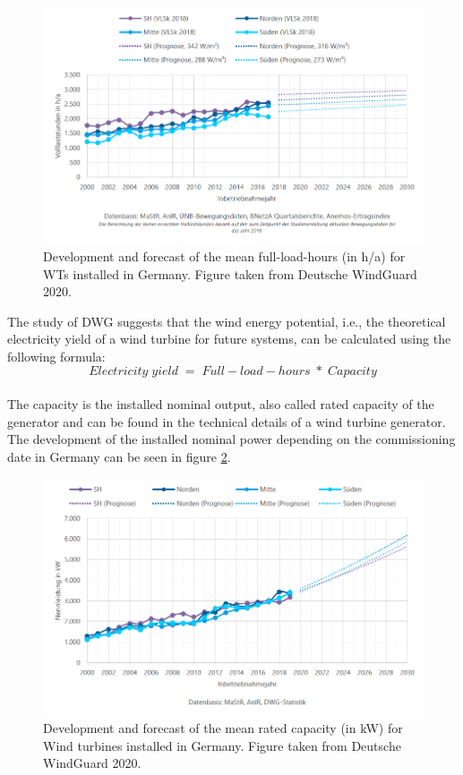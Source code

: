 \documentclass[a4paper,11pt]{article}
\begin{document}
\begin{figure}[H]

{\centering \includegraphics[width=1\linewidth]{figures/DWG/DWG_Volllaststunden} 

}

\caption{Development and forecast of the mean full-load-hours (in h/a) for WTs installed in Germany. Figure taken from Deutsche WindGuard 2020.}\label{fig:flh}
\end{figure}
The study of DWG suggests that the wind energy potential, i.e., the theoretical electricity yield of a wind turbine for future systems, can be calculated using the following formula:
\[
Electricity\;yield\; =\; Full-load-hours\; *\; Capacity
\]\\
The capacity is the installed nominal output, also called rated capacity of the generator and can be found in the technical details of a wind turbine generator. The development of the installed nominal power depending on the commissioning date in Germany can be seen in figure \ref{fig:capacity}.
\begin{figure}[H]

{\centering \includegraphics[width=1\linewidth]{figures/DWG/DWG_Nennleistung} 

}

\caption{Development and forecast of the mean rated capacity (in kW) for Wind turbines installed in Germany. Figure taken from Deutsche WindGuard 2020.}\label{fig:capacity}
\end{figure}
\end{document}
